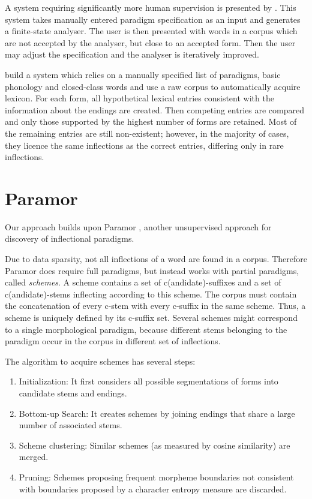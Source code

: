 \documentclass{itatnew}
\newcommand{\todojb}[1]{[\textbf{TODOJ} #1]} %
\begin{document}
A system requiring significantly more human supervision is presented by \cite{oflazer01}. This system takes manually entered paradigm specification as an input and generates a finite-state analyser. The user is then presented with words in a corpus which are not accepted by the analyser, but close to an accepted form. Then the user may adjust the specification and the analyser is iteratively improved.%

\cite{hana-etal-2004-emnlp,feldman-hana-2010-rodopi}
build a system which relies on a manually specified list of paradigms, basic phonology and closed-class words and use a raw corpus to automatically acquire lexicon. For each form, all hypothetical lexical entries consistent with the information about the endings are created. Then competing entries are compared and only those supported by the highest number of forms are retained. Most of the remaining entries are still non-existent; however, in the majority of cases, they licence the same inflections as the correct entries, differing only in rare inflections.


\section{Paramor}
\label{sec:paramor}

Our approach builds upon Paramor \cite{monson09}, another unsupervised approach for discovery of inflectional paradigms.

Due to data sparsity, not all inflections of a word are found in a corpus. Therefore Paramor does require 
full paradigms, but instead works with partial paradigms, called \emph{schemes}. A scheme contains a set of c(andidate)-suffixes and a set of c(andidate)-stems inflecting according to this scheme. The corpus must contain the concatenation of every c-stem with every c-suffix in the same scheme. Thus, a scheme is uniquely defined by its c-suffix set. Several schemes might correspond to a single morphological paradigm, because different stems belonging to the paradigm occur in the corpus in different set of inflections.

The algorithm to acquire schemes has several steps:
\begin{enumerate}
\item Initialization: It first considers all possible segmentations of forms into candidate stems and endings.
\item Bottom-up Search: It creates schemes by joining endings that share a large number of associated stems.
\item Scheme clustering: Similar schemes (as measured by cosine similarity) are merged.
\item Pruning: Schemes proposing frequent morpheme boundaries not consistent with boundaries proposed by a character entropy measure are discarded.
\end{enumerate}
\end{document}
